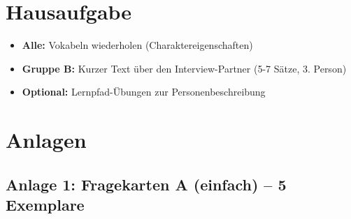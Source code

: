 \documentclass[11pt, a4paper]{article}
\begin{document}
\section{Hausaufgabe}

\begin{itemize}[leftmargin=2em]
    \item \textbf{Alle:} Vokabeln wiederholen (Charaktereigenschaften)
    \item \textbf{Gruppe B:} Kurzer Text über den Interview-Partner (5-7 Sätze, 3. Person)
    \item \textbf{Optional:} Lernpfad-Übungen zur Personenbeschreibung
\end{itemize}


\newpage
\section{Anlagen}

\subsection*{Anlage 1: Fragekarten A (einfach) -- 5 Exemplare}
\end{document}
